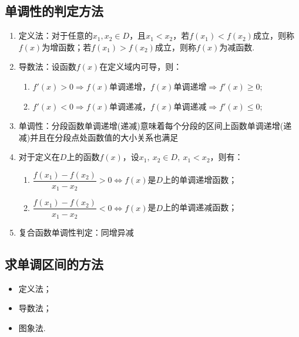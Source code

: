 \documentclass{BHCexam}
\begin{document}
\subsection{单调性的判定方法}
\begin{enumerate}[1)]
\item 定义法：对于任意的$ x_1,x_2\in D $，且$ x_1<x_2 $，若$ f(x_1)<f(x_2) $成立，则称$ f(x) $为增函数；若$ f(x_1)>f(x_2) $成立，则称$ f(x) $为减函数.
\item 导数法：设函数$f(x)$在定义域内可导，则：
\begin{enumerate}
\item $ f'(x) >0\Rightarrow f(x)$单调递增，$ f(x) $单调递增$ \Rightarrow f'(x)\ge 0 $;
\item $ f'(x) <0\Rightarrow f(x)$单调递减，$ f(x) $单调递减$ \Rightarrow f'(x)\le 0 $;	
\end{enumerate}
\item {}单调性：分段函数单调递增(递减)意味着每个分段的区间上函数单调递增(递减)并且在分段点处函数值的大小关系也满足 
\item 对于定义在$ D $上的函数$f(x)$，设$ x_1,~x_2 \in D,~x_1<x_2$，则有：
\begin{enumerate}
\item $\dfrac{f(x_1)-f(x_2)}{x_1-x_2}>0\Leftrightarrow f(x)$是$ D $上的单调递增函数；
\item  $\dfrac{f(x_1)-f(x_2)}{x_1-x_2}<0\Leftrightarrow f(x)$是$ D $上的单调递减函数；
\end{enumerate}
\item 复合函数单调性判定：同增异减
\end{enumerate}
\subsection{求单调区间的方法}
\begin{itemize}
\item 定义法；
\item 导数法；
\item 图象法.
\end{itemize}
\end{document}
